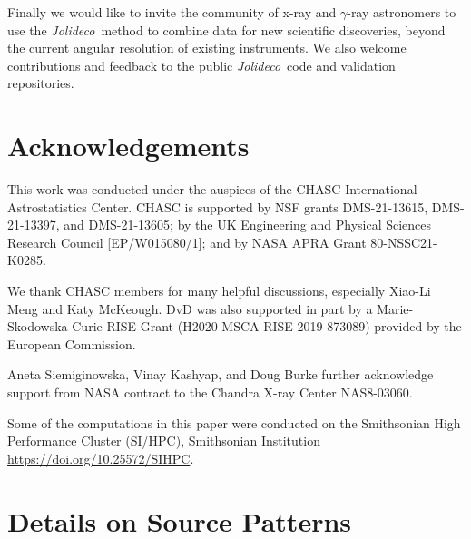 \documentclass[twocolumn]{aastex631}
\newcommand{\jolideco}{\textit{Jolideco}~}
\newcommand{\gammaray}{$\gamma$-ray\xspace}
\newcommand{\todo}[1]{\textcolor{red}{TODO: #1}\PackageWarning{TODO:}{#1!}}
\begin{document}
    Finally we would like to invite the community of x-ray and \gammaray astronomers to use the \jolideco method to combine data for new scientific discoveries, beyond the current angular resolution of existing instruments. We also welcome contributions and feedback to the public \jolideco code and validation repositories. 

    \section*{Acknowledgements}
    This work was conducted under the auspices of the CHASC International Astrostatistics Center.
    CHASC is supported by NSF grants DMS-21-13615, DMS-21-13397, and DMS-21-13605; by the UK Engineering
    and Physical Sciences Research Council [EP/W015080/1]; and by NASA APRA Grant 80-NSSC21-K0285.
    
    We thank CHASC members for many helpful discussions, especially Xiao-Li Meng and Katy McKeough.
    DvD was also supported in part by a Marie-Skodowska-Curie RISE Grant (H2020-MSCA-RISE-2019-873089)
    provided by the European Commission.
    
    Aneta Siemiginowska, Vinay Kashyap, and Doug Burke further acknowledge support from NASA
    contract to the Chandra X-ray Center NAS8-03060.

    Some of the computations in this paper were conducted on the Smithsonian High Performance
    Cluster (SI/HPC), Smithsonian Institution \url{https://doi.org/10.25572/SIHPC}.

    \newpage
    

    \appendix
    \section{Details on Source Patterns}

    
\end{document}
